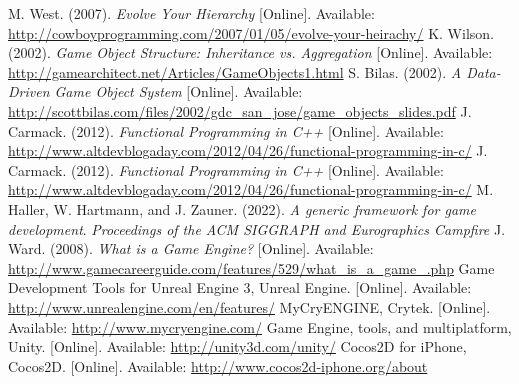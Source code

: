 \begin{thebibliography}{1}
M. West. (2007). \emph{Evolve Your Hierarchy} [Online]. Available: \url{http://cowboyprogramming.com/2007/01/05/evolve-your-heirachy/}
K. Wilson. (2002). \emph{Game Object Structure: Inheritance vs. Aggregation} [Online]. Available: \url{http://gamearchitect.net/Articles/GameObjects1.html}
S. Bilas. (2002). \emph{A Data-Driven Game Object System} [Online]. Available: \url{http://scottbilas.com/files/2002/gdc_san_jose/game_objects_slides.pdf}
J. Carmack. (2012). \emph{Functional Programming in C++} [Online]. Available: \url{http://www.altdevblogaday.com/2012/04/26/functional-programming-in-c/}
J. Carmack. (2012). \emph{Functional Programming in C++} [Online]. Available: \url{http://www.altdevblogaday.com/2012/04/26/functional-programming-in-c/}
M. Haller, W. Hartmann, and J. Zauner. (2022). \emph{A generic framework for game development}. \emph{Proceedings of the ACM SIGGRAPH and Eurographics Campfire}
J. Ward. (2008). \emph{What is a Game Engine?} [Online]. Available: \url{http://www.gamecareerguide.com/features/529/what_is_a_game_.php}
Game Development Tools for Unreal Engine 3, Unreal Engine. [Online]. Available: \url{http://www.unrealengine.com/en/features/}
MyCryENGINE, Crytek. [Online]. Available: \url{http://www.mycryengine.com/}
Game Engine, tools, and multiplatform, Unity. [Online]. Available: \url{http://unity3d.com/unity/}
Cocos2D for iPhone, Cocos2D. [Online]. Available: \url{http://www.cocos2d-iphone.org/about}
\end{thebibliography}
